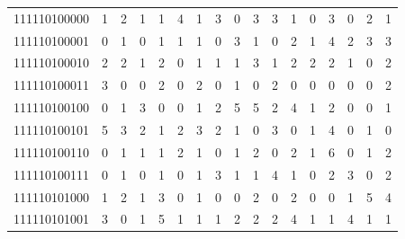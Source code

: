 \documentclass[10pt,a4paper]{article}
\begin{document}
\begin{longtable}{ |c|c|c|c|c|c|c|c|c|c|c|c|c|c|c|c|c| }
    111110100000              & 1                            & 2                                & 1                            & 1                              & 4   & 1   & 3   & 0   & 3   & 3   & 1   & 0   & 3   & 0   & 2   & 1   \\
    111110100001              & 0                            & 1                                & 0                            & 1                              & 1   & 1   & 0   & 3   & 1   & 0   & 2   & 1   & 4   & 2   & 3   & 3   \\
    111110100010              & 2                            & 2                                & 1                            & 2                              & 0   & 1   & 1   & 1   & 3   & 1   & 2   & 2   & 2   & 1   & 0   & 2   \\
    111110100011              & 3                            & 0                                & 0                            & 2                              & 0   & 2   & 0   & 1   & 0   & 2   & 0   & 0   & 0   & 0   & 0   & 2   \\
    111110100100              & 0                            & 1                                & 3                            & 0                              & 0   & 1   & 2   & 5   & 5   & 2   & 4   & 1   & 2   & 0   & 0   & 1   \\
    111110100101              & 5                            & 3                                & 2                            & 1                              & 2   & 3   & 2   & 1   & 0   & 3   & 0   & 1   & 4   & 0   & 1   & 0   \\
    111110100110              & 0                            & 1                                & 1                            & 1                              & 2   & 1   & 0   & 1   & 2   & 0   & 2   & 1   & 6   & 0   & 1   & 2   \\
    111110100111              & 0                            & 1                                & 0                            & 1                              & 0   & 1   & 3   & 1   & 1   & 4   & 1   & 0   & 2   & 3   & 0   & 2   \\
    111110101000              & 1                            & 2                                & 1                            & 3                              & 0   & 1   & 0   & 0   & 2   & 0   & 2   & 0   & 0   & 1   & 5   & 4   \\
    111110101001              & 3                            & 0                                & 1                            & 5                              & 1   & 1   & 1   & 2   & 2   & 2   & 4   & 1   & 1   & 4   & 1   & 1   \\

\end{longtable}
\end{document}
